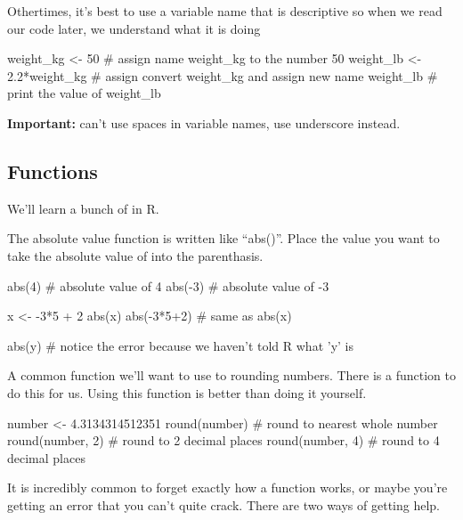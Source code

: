 Othertimes, it's best to use a variable name that is descriptive so
when we read our code later, we understand what it is doing

\begin{example}[Convert kg to lb's]
  \begin{rcode}    
    weight_kg <- 50 # assign name weight_kg to the number 50
    weight_lb <- 2.2*weight_kg # assign convert weight_kg and assign new name
    weight_lb # print the value of weight_lb
  \end{rcode}
  \textbf{Important:} can't use spaces in variable names, use underscore instead.
\end{example}
  
\subsection{Functions}
\label{sec:r_functions}

We'll learn a bunch of  in R.  

\begin{example}
  The absolute value function is written like ``abs()''.  Place the
  value you want to take the absolute value of into the parenthasis.
  \begin{rcode}
    abs(4) # absolute value of 4
    abs(-3) # absolute value of -3
    
    x <- -3*5 + 2
    abs(x)
    abs(-3*5+2) # same as abs(x)

    abs(y) # notice the error because we haven't told R what 'y' is
  \end{rcode}    
\end{example}

\begin{example}
  A common function we'll want to use to rounding numbers.  There is
  a function to do this for us.  Using this function is better than
  doing it yourself.
  \begin{rcode}
    number <- 4.3134314512351
    round(number) # round to nearest whole number
    round(number, 2) # round to 2 decimal places
    round(number, 4) # round to 4 decimal places
  \end{rcode}    
\end{example}

It is incredibly common to forget exactly how a function works, or
maybe you're getting an error that you can't quite crack. There are
two ways of getting help.

